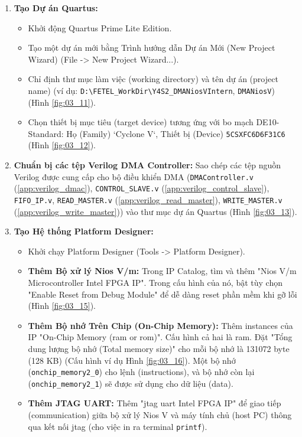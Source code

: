 \begin{enumerate}
    \item \textbf{Tạo Dự án Quartus:}
    \begin{itemize}
        \item Khởi động Quartus Prime Lite Edition.
        \item Tạo một dự án mới bằng Trình hướng dẫn Dự án Mới (New Project Wizard) (File -> New Project Wizard...).
        \item Chỉ định thư mục làm việc (working directory) và tên dự án (project name) (ví dụ: \texttt{D:\textbackslash FETEL\_WorkDir\textbackslash Y4S2\_DMANiosVIntern}, \texttt{DMANiosV}) (Hình \ref{fig:03_11}).
        \item Chọn thiết bị mục tiêu (target device) tương ứng với bo mạch DE10-Standard: Họ (Family) `Cyclone V`, Thiết bị (Device) \texttt{5CSXFC6D6F31C6} (Hình \ref{fig:03_12}).
    \end{itemize}
    \item \textbf{Chuẩn bị các tệp Verilog DMA Controller:} Sao chép các tệp nguồn Verilog được cung cấp cho bộ điều khiển DMA (\texttt{DMAController.v} (\ref{app:verilog_dmac}), \texttt{CONTROL\_SLAVE.v} (\ref{app:verilog_control_slave}), \texttt{FIFO\_IP.v}, \texttt{READ\_MASTER.v} (\ref{app:verilog_read_master}), \texttt{WRITE\_MASTER.v} (\ref{app:verilog_write_master})) vào thư mục dự án Quartus (Hình \ref{fig:03_13}).
    \item \textbf{Tạo Hệ thống Platform Designer:}
    \begin{itemize}
        \item Khởi chạy Platform Designer (Tools -> Platform Designer).
        \item \textbf{Thêm Bộ xử lý Nios V/m:} Trong IP Catalog, tìm và thêm "Nios V/m Microcontroller Intel FPGA IP". Trong cấu hình của nó, bật tùy chọn  "Enable Reset from Debug Module" để dễ dàng reset phần mềm khi gỡ lỗi (Hình \ref{fig:03_15}).
        \item \textbf{Thêm Bộ nhớ Trên Chip (On-Chip Memory):} Thêm instances của IP "On-Chip Memory (\acrshort{ram} or \acrshort{rom})". Cấu hình cả hai là \acrshort{ram}. Đặt "Tổng dung lượng bộ nhớ (Total memory size)" cho mỗi bộ nhớ là 131072 byte (128 KB) (Cấu hình ví dụ Hình \ref{fig:03_16}). Một bộ nhớ (\texttt{onchip\_memory2\_0}) cho lệnh (instructions), và bộ nhớ còn lại (\texttt{onchip\_memory2\_1}) sẽ được sử dụng cho dữ liệu (data).
        \item \textbf{Thêm JTAG UART:} Thêm "\acrshort{jtag} \acrshort{uart} Intel FPGA IP" để giao tiếp (communication) giữa bộ xử lý Nios V và máy tính chủ (host PC) thông qua kết nối \acrshort{jtag} (cho việc in ra terminal \texttt{printf}).

\end{itemize}
\end{enumerate}
